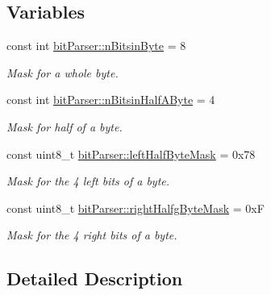 \subsection*{Variables}
\begin{DoxyCompactItemize}
\item 
\mbox{\label{group__bit_parser_ga1089bf9f6a8c7710cb6f4161697d437c}} 
const int \mbox{\hyperlink{group__bit_parser_ga1089bf9f6a8c7710cb6f4161697d437c}{bit\+Parser\+::n\+Bitsin\+Byte}} = 8
\begin{DoxyCompactList}\small\item\em Mask for a whole byte. \end{DoxyCompactList}\item 
\mbox{\label{group__bit_parser_ga47dacd6f8d9409a4866c9e22f8e0a3ca}} 
const int \mbox{\hyperlink{group__bit_parser_ga47dacd6f8d9409a4866c9e22f8e0a3ca}{bit\+Parser\+::n\+Bitsin\+Half\+A\+Byte}} = 4
\begin{DoxyCompactList}\small\item\em Mask for half of a byte. \end{DoxyCompactList}\item 
\mbox{\label{group__bit_parser_ga3706423b79d72421f8796475baf10c27}} 
const uint8\+\_\+t \mbox{\hyperlink{group__bit_parser_ga3706423b79d72421f8796475baf10c27}{bit\+Parser\+::left\+Half\+Byte\+Mask}} = 0x78
\begin{DoxyCompactList}\small\item\em Mask for the 4 left bits of a byte. \end{DoxyCompactList}\item 
\mbox{\label{group__bit_parser_gaadb1b05603363dca189d9f3900cebce4}} 
const uint8\+\_\+t \mbox{\hyperlink{group__bit_parser_gaadb1b05603363dca189d9f3900cebce4}{bit\+Parser\+::right\+Halfg\+Byte\+Mask}} = 0xF
\begin{DoxyCompactList}\small\item\em Mask for the 4 right bits of a byte. \end{DoxyCompactList}\end{DoxyCompactItemize}


\subsection{Detailed Description}


